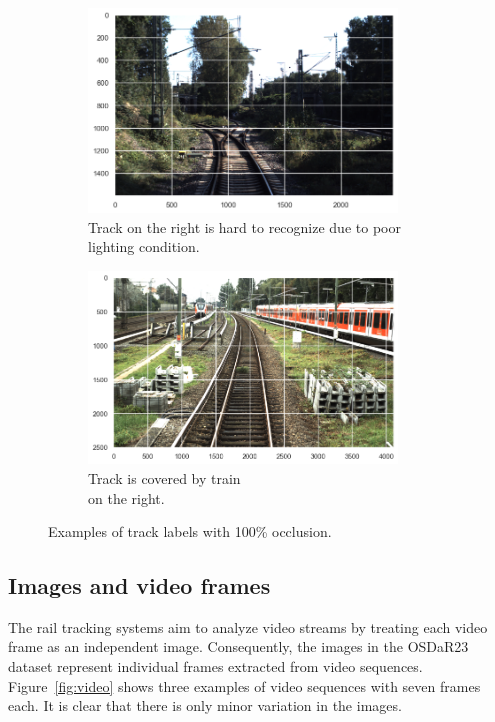 \documentclass[Master,MDS,english]{BASE/twbook} %
\begin{document}
\begin{figure}
\centering
\begin{subfigure}[t]{.5\textwidth}
  \centering
  \includegraphics[width=0.9\textwidth]{images/datasets/db/occlusion_example1}
  \caption{Track on the right is hard to recognize due to poor lighting condition.}
\end{subfigure}%
\begin{subfigure}[t]{.5\textwidth}
  \centering
  \includegraphics[width=0.9\textwidth]{images/datasets/db/occlusion_example2}
  \caption{Track is covered by train \\ on the right. }
\end{subfigure}
\caption{Examples of track labels with 100\% occlusion.}
\label{fig:occlusion_examples}
\end{figure}


\subsection{Images and video frames}

The rail tracking systems aim to analyze video streams by treating each video frame as an independent image. Consequently, the images in the OSDaR23 dataset represent individual frames extracted from video sequences. 	Figure~\ref{fig:video} shows three examples of video sequences with seven frames each. It is clear that there is only minor variation in the images.
\end{document}

